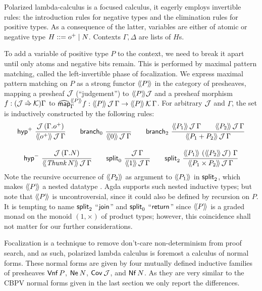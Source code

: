 \documentclass[a4paper,USenglish,cleveref, autoref]{lipics-v2019}
\begin{document}
Polarized lambda-calculus
\cite{zeilberger:PhD,espiritoSanto:entcs17}
is a focused calculus, it eagerly employs
invertible rules: the introduction rules for negative types and the
elimination rules for positive types.  As a consequence of the latter,
variables are either of atomic or negative type $H ::= \patom \mid N$.
Contexts $\Gamma,\Delta$ are lists of $H$s.

To add a variable of positive type $P$ to the context, we need to
break it apart until only atoms and negative bits remain.  This is
performed by maximal pattern matching, called the left-invertible
phase of focalization.
We express maximal pattern matching on $P$ as a strong functor
$\Add P$ in the category of presheaves,
mapping a presheaf $\J$ (``judgement'') to $\Add P \J$
and a presheaf morphism $f : (\J \hatto \K)\Gamma$ to
$\stmap[\Add P]_\Gamma f : \AddHyp P \J \Gamma \to \AddHyp P \K \Gamma$.
For arbitrary $\J$ and $\Gamma$, the set  is
inductively constructed by the following rules:
\begin{gather*}
  \nru{\phyp}
      {\J\,(\cext \Gamma \patom)}
      {\AddHyp {\patom} \J \Gamma}
\qquad
  \nru{\nbranch}
      {}
      {\AddHyp {\tyzero} \J \Gamma}
\qquad
  \nru{\bbranch}
      {\AddHyp {P_1} \J \Gamma \qquad
       \AddHyp {P_2} \J \Gamma }
      {\AddHyp {P_1 + P_2} \J \Gamma}
\\[2ex]
  \nru{\nhyp}
      {\J\,(\cext \Gamma N)}
      {\AddHyp {\Thunk N} \J \Gamma}
\qquad
  \nru{\nsplit}
      {\J\,\Gamma}
      {\AddHyp {\tyone} \J \Gamma}
\qquad
  \nru{\bsplit}
      {\AddHyp {P_1} {\left(\Add{P_2}\,\J\right)} \Gamma}
      {\AddHyp {P_1 \times P_2} \J \Gamma}
\end{gather*}
Note the recursive occurrence of $\Add{P_2}$ as argument to
$\Add{P_1}$ in $\bsplit$, which makes $\Add P$ a nested datatype
\cite{bird:nested}.  Agda supports such nested inductive types; but
note that $\Add{P}$ is uncontroversial, since it could also be defined
by recursion on $P$.   It is tempting to name $\bsplit$
``$\tjoin$'' and $\nsplit$ ``$\treturn$''
since $\Add P$ is a graded monad on the monoid $(1,\times)$
of product types;
however, this coincidence shall not matter for our further considerations.

Focalization is a technique to remove don't-care non-determinism from
proof search, and as such, polarized lambda calculus is foremost a
calculus of normal forms.
These normal forms are given by four mutually defined inductive
families of presheaves $\tVnf\,P$,
$\tNe\,N$, $\Cov\,\J$,
and $\tNf\,N$.  As they are very similar to the CBPV normal forms
given in the last section we only report the differences.
\end{document}
